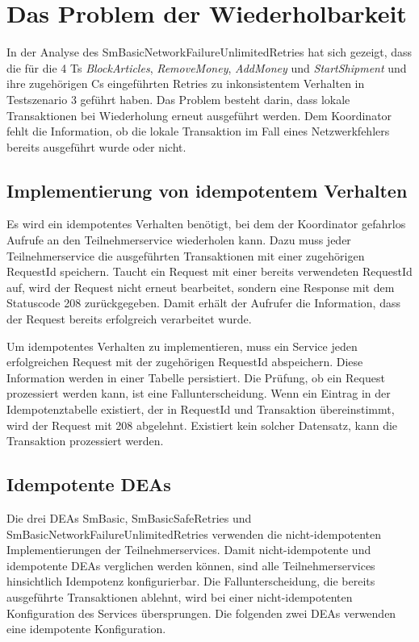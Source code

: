 \section{Das Problem der Wiederholbarkeit}

In der Analyse des SmBasicNetworkFailureUnlimitedRetries hat sich gezeigt, dass die für die 4 Ts \textit{BlockArticles}, \textit{RemoveMoney}, \textit{AddMoney} und \textit{StartShipment} und ihre zugehörigen Cs eingeführten Retries zu inkonsistentem Verhalten in Testszenario 3 geführt haben. Das Problem besteht darin, dass lokale Transaktionen bei Wiederholung erneut ausgeführt werden. Dem Koordinator fehlt die Information, ob die lokale Transaktion im Fall eines Netzwerkfehlers bereits ausgeführt wurde oder nicht. 

\subsection{Implementierung von idempotentem Verhalten} 
Es wird ein idempotentes Verhalten benötigt, bei dem der Koordinator gefahrlos Aufrufe an den Teilnehmerservice wiederholen kann. Dazu muss jeder Teilnehmerservice die ausgeführten Transaktionen mit einer zugehörigen RequestId speichern. Taucht ein Request mit einer bereits verwendeten RequestId auf, wird der Request nicht erneut bearbeitet, sondern eine Response mit dem Statuscode 208 zurückgegeben. Damit erhält der Aufrufer die Information, dass der Request bereits erfolgreich verarbeitet wurde. 

Um idempotentes Verhalten zu implementieren, muss ein Service jeden erfolgreichen Request mit der zugehörigen RequestId abspeichern. Diese Information werden in einer Tabelle persistiert. Die Prüfung, ob ein Request prozessiert werden kann, ist eine Fallunterscheidung. Wenn ein Eintrag in der Idempotenztabelle existiert, der in RequestId und Transaktion übereinstimmt, wird der Request mit 208 abgelehnt. Existiert kein solcher Datensatz, kann die Transaktion prozessiert werden.

\subsection{Idempotente DEAs}
Die drei DEAs SmBasic, SmBasicSafeRetries und SmBasicNetworkFailureUnlimitedRetries verwenden die nicht-idempotenten Implementierungen der Teilnehmerservices. Damit nicht-idempotente und idempotente DEAs verglichen werden können, sind alle Teilnehmerservices hinsichtlich Idempotenz konfigurierbar. Die Fallunterscheidung, die bereits ausgeführte Transaktionen ablehnt, wird bei einer nicht-idempotenten Konfiguration des Services übersprungen. Die folgenden zwei DEAs verwenden eine idempotente Konfiguration. 